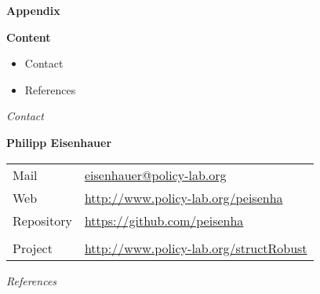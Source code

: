 \beginbackup\appendix
\begin{frame}\begin{center}
\LARGE\textbf{Appendix}
\end{center}\end{frame}
\begin{frame}
\textbf{Content}\medskip
\begin{itemize}\setlength\itemsep{1em}
\item Contact 
\item References
\end{itemize}
\end{frame}
\begin{frame}\begin{center}
\LARGE\textit{Contact}
\end{center}\end{frame}

\begin{frame}

\textbf{Philipp Eisenhauer}\\\vspace{0.5cm}
\begin{tabular}{ll}
Mail		& \href{mailto:eisenhauer@policy-lab.org}{eisenhauer@policy-lab.org}\\
Web     	& \url{http://www.policy-lab.org/peisenha} \\
Repository  & \url{https://github.com/peisenha}\\
  & \\
Project  & \url{http://www.policy-lab.org/structRobust}\\
\end{tabular}

\end{frame}
\begin{frame}\begin{center}
\LARGE\textit{References}
\end{center}\end{frame}
\begin{frame}[allowframebreaks]\frametitle{}

\nocite{Keane.1994} 
\nocite{Keane.1994b}
\nocite{Eisenhauer.2015b}
\nocite{Stoye.2012,Hansen.2007,Iyengar.2005,Epstein.2007a,Epstein.2003,Gilboa.1989}
\nocite{Epstein.2010,Heckman.2006a,Mincer.1974,Mincer.1958,Navarro.2011}





\end{frame}

\backupend